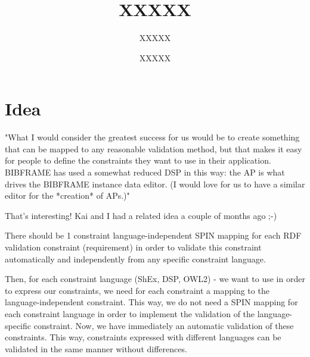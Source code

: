 \documentclass{llncs}
\begin{document}
%
%
\title{XXXXX}
%
%
\author{XXXXX \and XXXXX}
%
%

\maketitle              %

\begin{abstract}


\end{abstract}
%

\section{Idea}

"What I would consider the greatest success
for us would be to create something that can be mapped to any reasonable
validation method, but that makes it easy for people to define the
constraints they want to use in their application. BIBFRAME has used a
somewhat reduced DSP in this way: the AP is what drives the BIBFRAME
instance data editor. (I would love for us to have a similar editor for
the *creation* of APs.)"

That's interesting!
Kai and I had a related idea a couple of months ago ;-)

There should be 1 constraint language-independent SPIN mapping for each RDF validation constraint (requirement) 
in order to validate this constraint automatically and independently from any specific constraint language.

Then, for each constraint language (ShEx, DSP, OWL2) - we want to use in order to express our constraints, 
we need for each constraint a mapping to the language-independent constraint.
This way, we do not need a SPIN mapping for each constraint language in order to implement the validation of the language-specific constraint.
Now, we have immediately an automatic validation of these constraints.
This way, constraints expressed with different languages can be validated in the same manner without differences.
\end{document}
